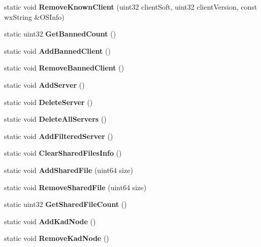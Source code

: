 \begin{DoxyCompactItemize}
\item 
static void {\bfseries RemoveKnownClient} (uint32 clientSoft, uint32 clientVersion, const wxString \&OSInfo)\label{classCStatistics_a01cb3bc3830e8cc6f90e86187357c6e7}

\item 
static uint32 {\bfseries GetBannedCount} ()\label{classCStatistics_aa74606722f0f6ea1f825bc2b5f4c19dd}

\item 
static void {\bfseries AddBannedClient} ()\label{classCStatistics_aaec3cdeedb525c750145eda7bbb9aa62}

\item 
static void {\bfseries RemoveBannedClient} ()\label{classCStatistics_aebda86bbc4e3c5c925cb1dc2f7ad2320}

\item 
static void {\bfseries AddServer} ()\label{classCStatistics_a339edf567e2f051148742f53c8667a0c}

\item 
static void {\bfseries DeleteServer} ()\label{classCStatistics_a24ef62f8183fb082f2dde39138cfd1fe}

\item 
static void {\bfseries DeleteAllServers} ()\label{classCStatistics_a5d0b13b73dfd3a405f1614360a42e86d}

\item 
static void {\bfseries AddFilteredServer} ()\label{classCStatistics_a650283c2d24338fe8c4a2f228f958572}

\item 
static void {\bfseries ClearSharedFilesInfo} ()\label{classCStatistics_a7f6778ebc01173a37fa3186754ca6dff}

\item 
static void {\bfseries AddSharedFile} (uint64 size)\label{classCStatistics_a8f94af2de8c544086f16cb5385dde72d}

\item 
static void {\bfseries RemoveSharedFile} (uint64 size)\label{classCStatistics_ac2787638e3496130e52df71652203ff5}

\item 
static uint32 {\bfseries GetSharedFileCount} ()\label{classCStatistics_a81875b67395be3c81f523a308394befa}

\item 
static void {\bfseries AddKadNode} ()\label{classCStatistics_ab05fa1d5b7d8e357f5e6c2ddd7c27062}

\item 
static void {\bfseries RemoveKadNode} ()\label{classCStatistics_a2b64c92a9519251cf47434eb8fdeba81}


\end{DoxyCompactItemize}
